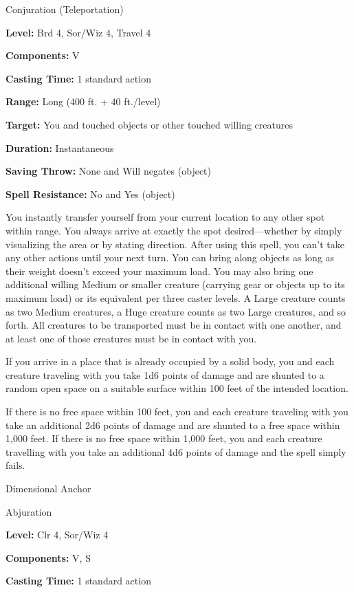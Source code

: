 \documentclass{article}
\begin{document}
Conjuration (Teleportation)

\textbf{Level:} Brd 4, Sor/Wiz 4, Travel 4

\textbf{Components:} V

\textbf{Casting Time:} 1 standard action

\textbf{Range:} Long (400 ft. + 40 ft./level)

\textbf{Target:} You and touched objects or other touched willing creatures

\textbf{Duration:} Instantaneous

\textbf{Saving Throw:} None and Will negates (object)

\textbf{Spell Resistance:} No and Yes (object)

You instantly transfer yourself from your current location to any other spot within 
range. You always arrive at exactly the spot desired---whether by simply visualizing 
the area or by stating direction. After using this spell, you can't take any other 
actions until your next turn. You can bring along objects as long as their weight 
doesn't exceed your maximum load. You may also bring one additional willing Medium 
or smaller creature (carrying gear or objects up to its maximum load) or its equivalent 
per three caster levels. A Large creature counts as two Medium creatures, a Huge 
creature counts as two Large creatures, and so forth. All creatures to be transported 
must be in contact with one another, and at least one of those creatures must be 
in contact with you.

If you arrive in a place that is already occupied by a solid body, you and each 
creature traveling with you take 1d6 points of damage and are shunted to a random 
open space on a suitable surface within 100 feet of the intended location.

If there is no free space within 100 feet, you and each creature traveling with 
you take an additional 2d6 points of damage and are shunted to a free space within 
1,000 feet. If there is no free space within 1,000 feet, you and each creature 
travelling with you take an additional 4d6 points of damage and the spell simply 
fails.

\vspace{12pt}
Dimensional Anchor

Abjuration

\textbf{Level:} Clr 4, Sor/Wiz 4

\textbf{Components:} V, S

\textbf{Casting Time:} 1 standard action
\end{document}
